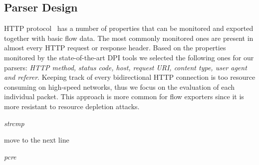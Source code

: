 \subsection{Parser Design} \label{subsec:http-tool_design}

HTTP protocol~\cite{rfc7230} has a number of properties that can be monitored and exported together with basic flow data. The most commonly monitored ones are present in almost every HTTP request or response header. Based on the properties monitored by the state-of-the-art DPI tools we selected the following ones for our parsers: \emph{HTTP method, status code, host, request URI, content type, user agent and referer}. Keeping track of every bidirectional HTTP connection is too resource consuming on high-speed networks, thus we focus on the evaluation of each individual packet. This approach is more common for flow exporters since it is more resistant to resource depletion attacks.

\noindent\hspace{1pt}
\begin{minipage}[t]{(0.49\textwidth)-2pt}
\begin{algorithm}[H]
\caption{\emph{strcmp} }
\label{alg:strcmp}
{\fontsize{8}{10}\selectfont
\begin{algorithmic}[1]
                \ENDIF
            \ENDFOR
            \STATE move to the next line
        \ENDWHILE
    \ELSE 
    \ENDIF
\end{algorithmic}
}
\end{algorithm}
\end{minipage}%
\hfill
\begin{minipage}[t]{0.47\textwidth}
\begin{algorithm}[H]
\caption{\emph{pcre}}
\label{alg:pcre}
{\fontsize{8}{10}\selectfont
\begin{algorithmic}[1]
            \ENDIF
        \ENDFOR
    \ELSE 
    \ENDIF
\end{algorithmic}
}
\end{algorithm}
\end{minipage}
\vspace{10pt}

